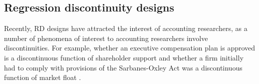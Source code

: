 \documentclass[12pt,reqno,titlepage]{amsart}
\begin{document}
\begin{doublespace}


\subsection{Regression discontinuity designs}
Recently, RD designs have attracted the interest of accounting researchers, as a number of phenomena of interest to accounting researchers involve discontinuities. 
For example, whether an executive compensation plan is approved is a discontinuous function of shareholder support \citep[e.g.,][]{Armstrong:2013io} and whether a firm initially had to comply with provisions of the Sarbanes-Oxley Act was a discontinuous function of market float \citep{Iliev:2010ic} .


\end{doublespace}
\end{document}

